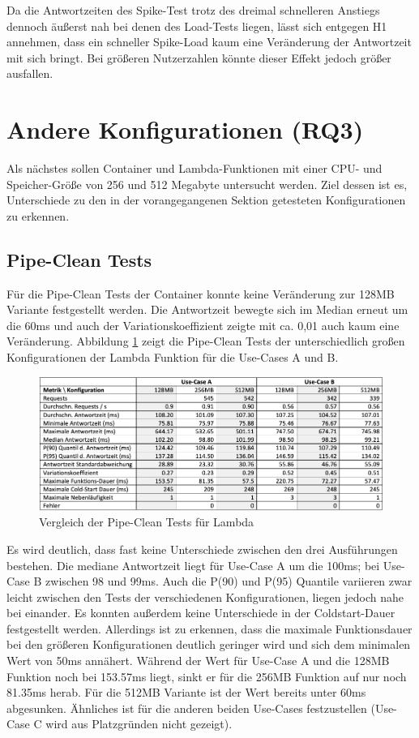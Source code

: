 Da die Antwortzeiten des Spike-Test trotz des dreimal schnelleren Anstiegs dennoch äußerst nah bei denen des Load-Tests liegen, lässt sich entgegen H1 annehmen, dass ein schneller Spike-Load kaum eine Veränderung der Antwortzeit mit sich bringt. Bei größeren Nutzerzahlen könnte dieser Effekt jedoch größer ausfallen.


\section{Andere Konfigurationen (RQ3)}
Als nächstes sollen Container und Lambda-Funktionen mit einer CPU- und Speicher-Größe von 256 und 512 Megabyte untersucht werden. Ziel dessen ist es, Unterschiede zu den in der vorangegangenen Sektion getesteten Konfigurationen zu erkennen.

\subsection{Pipe-Clean Tests}
Für die Pipe-Clean Tests der Container konnte keine Veränderung zur 128MB Variante festgestellt werden. Die Antwortzeit bewegte sich im Median erneut um die 60ms und auch der Variationskoeffizient zeigte mit ca. 0,01 auch kaum eine Veränderung.
Abbildung \ref{fig:pipe-comparison} zeigt die Pipe-Clean Tests der unterschiedlich großen Konfigurationen der Lambda Funktion für die Use-Cases A und B.

\begin{figure}[H]
    \includegraphics[width=\textwidth]{img/pipe-comparison.png}
    \caption[Vergleich der Pipe-Clean Tests für Lambda]{Vergleich der Pipe-Clean Tests für Lambda}
    \label{fig:pipe-comparison}
\end{figure}

Es wird deutlich, dass fast keine Unterschiede zwischen den drei Ausführungen bestehen. Die mediane Antwortzeit liegt für Use-Case A um die 100ms; bei Use-Case B zwischen 98 und 99ms. Auch die P(90) und P(95) Quantile variieren zwar leicht zwischen den Tests der verschiedenen Konfigurationen, liegen jedoch nahe bei einander. Es konnten außerdem keine Unterschiede in der Coldstart-Dauer festgestellt werden. 
Allerdings ist zu erkennen, dass die maximale Funktionsdauer bei den größeren Konfigurationen deutlich geringer wird und sich dem minimalen Wert von 50ms annähert. Während der Wert für Use-Case A und die 128MB Funktion noch bei 153.57ms liegt, sinkt er für die 256MB Funktion auf nur noch 81.35ms herab. Für die 512MB Variante ist der Wert bereits unter 60ms abgesunken. Ähnliches ist für die anderen beiden Use-Cases festzustellen (Use-Case C wird aus Platzgründen nicht gezeigt).

